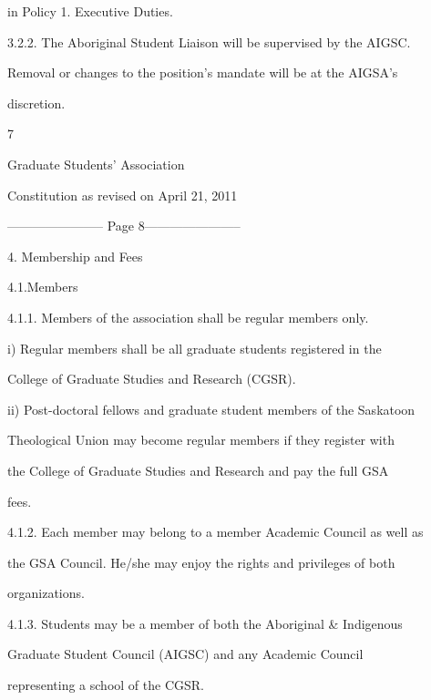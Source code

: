 \documentclass{article}
\begin{document}
in Policy 1. Executive Duties.   



3.2.2.  The  Aboriginal  Student  Liaison  will  be  supervised  by  the  AIGSC.  

Removal  or  changes  to  the  position’s  mandate  will  be  at  the  AIGSA’s  

discretion.  





      7  



       Graduate Students’ Association  



  Constitution as revised on April 21, 2011  


----------------------- Page 8-----------------------

4.  Membership and Fees  



4.1.Members  



4.1.1. Members of the association shall be regular members only.  



i)      Regular  members  shall  be  all  graduate  students  registered  in  the  

College of Graduate Studies and Research (CGSR).  



ii)     Post-doctoral fellows and graduate student members of the Saskatoon  

Theological Union may become regular members if they register with  

the College of Graduate  Studies  and  Research and  pay  the  full  GSA  

fees.  



4.1.2. Each member may belong to a member Academic Council as well as  

the GSA Council. He/she may enjoy the rights and privileges of both  

organizations.  



4.1.3.  Students  may  be  a  member  of  both  the  Aboriginal  \&  Indigenous  

Graduate   Student   Council   (AIGSC)   and   any   Academic   Council  

representing a school of the CGSR.  
\end{document}
